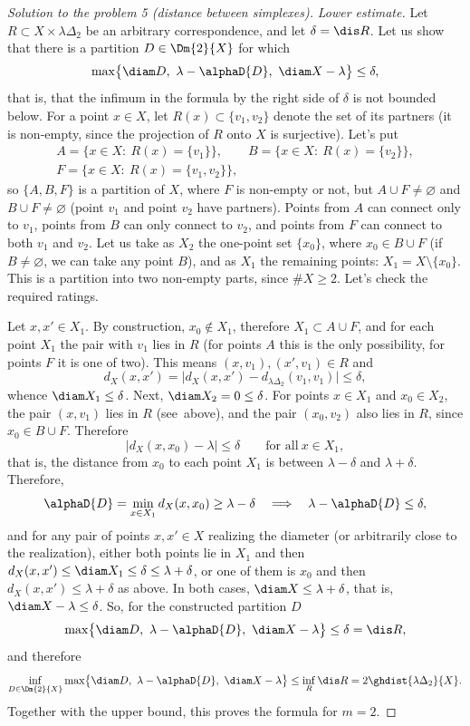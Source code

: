 \documentclass[a4paper,12pt]{report}
\begin{document}
\begin{proof}[Solution to the problem \textup{5} \textup{(}distance between simplexes\textup{)}]
\textit{Lower estimate.} Let $R\subset X\times\lambda\Delta_2$ be an arbitrary correspondence, and let $\delta=\dis R$. Let us show that there is a partition $D\in\Dm{2}{X}$ for which
\[
\max\bigl\{\diam D,\ \lambda-\alphaD{D},\ \diam X-\lambda\bigr\}\le\delta ,
\]
that is, that the infimum in the formula by the right side of $\delta$ is not bounded below. For a point $x\in X$, let $R(x)\subset\{v_1,v_2\}$ denote the set of its partners (it is non-empty, since the projection of $R$ onto $X$ is surjective). Let's put
\[
\begin{gathered}
A=\bigl\{x\in X:\ R(x)=\{v_1\}\bigr\},\qquad B=\bigl\{x\in X:\ R(x)=\{v_2\}\bigr\},\\
F=\bigl\{x\in X:\ R(x)=\{v_1,v_2\}\bigr\},
\end{gathered}
\]
so $\{A,B,F\}$ is a partition of $X$, where $F$ is non-empty or not, but $A\cup F\ne\varnothing$ and $B\cup F\ne\varnothing$ \textup{(}point $v_1$ and point $v_2$ have partners\textup{)}. Points from $A$ can connect only to $v_1$, points from $B$ can only connect to $v_2$, and points from $F$ can connect to both $v_1$ and $v_2$. Let us take as $X_2$ the one-point set $\{x_0\}$, where $x_0\in B\cup F$ \textup{(}if $B\ne\varnothing$, we can take any point $B$\textup{)}, and as $X_1$ the remaining points\textup{:} $X_1=X\setminus\{x_0\}$. This is a partition into two non-empty parts, since $\#X\ge2$. Let's check the required ratings.

Let $x,x'\in X_1$. By construction, $x_0\notin X_1$, therefore $X_1\subset A\cup F$, and for each point $X_1$ the pair with $v_1$ lies in $R$ \textup{(}for points $A$ this is the only possibility, for points $F$ it is one of two\textup{)}. This means $(x,v_1),(x',v_1)\in R$ and
\[
d_X(x,x')=\bigl|d_X(x,x')-d_{\lambda\Delta_2}(v_1,v_1)\bigr|\le\delta ,
\]
whence $\diam X_1\le\delta$. Next, $\diam X_2=0\le\delta$. For points $x\in X_1$ and $x_0\in X_2$, the pair $(x,v_1)$ lies in $R$ \textup{(}see\ above\textup{)}, and the pair $(x_0,v_2)$ also lies in $R$, since $x_0\in B\cup F$. Therefore
\[
\bigl|d_X(x,x_0)-\lambda\bigr|\le\delta\qquad\text{for all}\ x\in X_1 ,
\]
that is, the distance from $x_0$ to each point $X_1$ is between $\lambda-\delta$ and $\lambda+\delta$. Therefore,
\[
\alphaD{D}=\min_{x\in X_1}d_X(x,x_0)\ge\lambda-\delta
\quad\Longrightarrow\quad
\lambda-\alphaD{D}\le\delta ,
\]
and for any pair of points $x,x'\in X$ realizing the diameter \textup{(}or arbitrarily close to the realization\textup{)}, either both points lie in $X_1$ and then $d_X(x,x')\le\diam X_1\le\delta\le\lambda+\delta$, or one of them is $x_0$ and then $d_X(x,x')\le\lambda+\delta$ as above. In both cases, $\diam X\le\lambda+\delta$, that is, $\diam X-\lambda\le\delta$. So, for the constructed partition $D$
\[
\max\bigl\{\diam D,\ \lambda-\alphaD{D},\ \diam X-\lambda\bigr\}\le\delta=\dis R ,
\]
and therefore
\[
\inf_{D\in\Dm{2}{X}}\max\bigl\{\diam D,\ \lambda-\alphaD{D},\ \diam X-\lambda\bigr\}\le\inf_R\dis R=2\ghdist{\lambda\Delta_2}{X} .
\]
Together with the upper bound, this proves the formula for $m=2$.


\end{proof}
\end{document}
